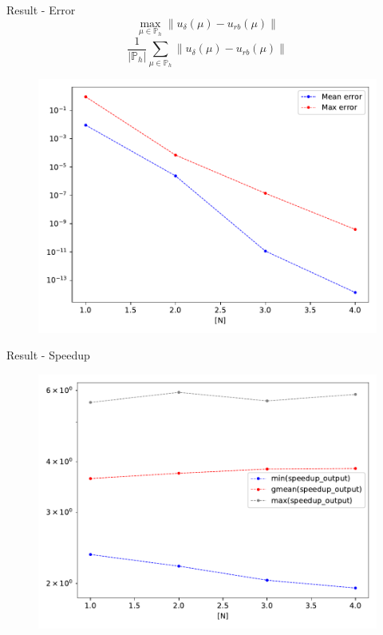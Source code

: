 \documentclass[9pt]{beamer}
\begin{document}
\begin{frame}{Result - Error}
$$\max_{\mu \in \mathbb{P}_h} \|u_{\delta}(\mu) - u_{rb}(\mu)\|$$
$$\frac{1}{|\mathbb{P}_h|} \sum_{\mu \in \mathbb{P}_h} \|u_{\delta}(\mu) - u_{rb}(\mu)\|$$
\begin{figure}
    \centering
    \includegraphics[height=0.55\paperheight]{output_error.pdf}
\end{figure}
\end{frame}

\begin{frame}{Result - Speedup}

\begin{figure}
    \centering
    \includegraphics[height=0.75\paperheight]{speedup_output.pdf}
\end{figure}
\end{frame}
\end{document}
